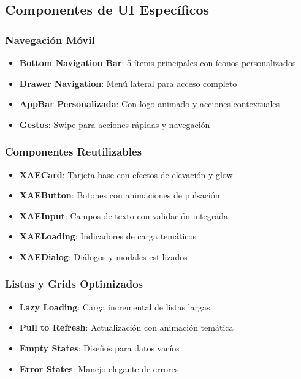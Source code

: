 \documentclass[12pt]{article}
\begin{document}
\subsection{Componentes de UI Específicos}

\subsubsection{Navegación Móvil}
\begin{itemize}
    \item \textbf{Bottom Navigation Bar}: 5 ítems principales con íconos personalizados
    \item \textbf{Drawer Navigation}: Menú lateral para acceso completo
    \item \textbf{AppBar Personalizada}: Con logo animado y acciones contextuales
    \item \textbf{Gestos}: Swipe para acciones rápidas y navegación
\end{itemize}

\subsubsection{Componentes Reutilizables}
\begin{itemize}
    \item \textbf{XAECard}: Tarjeta base con efectos de elevación y glow
    \item \textbf{XAEButton}: Botones con animaciones de pulsación
    \item \textbf{XAEInput}: Campos de texto con validación integrada
    \item \textbf{XAELoading}: Indicadores de carga temáticos
    \item \textbf{XAEDialog}: Diálogos y modales estilizados
\end{itemize}

\subsubsection{Listas y Grids Optimizados}
\begin{itemize}
    \item \textbf{Lazy Loading}: Carga incremental de listas largas
    \item \textbf{Pull to Refresh}: Actualización con animación temática
    \item \textbf{Empty States}: Diseños para datos vacíos
    \item \textbf{Error States}: Manejo elegante de errores
\end{itemize}
\end{document}
